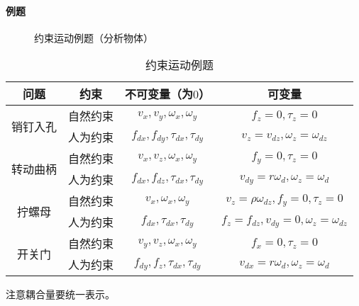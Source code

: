 \documentclass[
12pt, %
a4paper, 
oneside, %
headinclude,footinclude, %
]{scrartcl}
\begin{document}
\paragraph{例题}
\begin{figure}[H]
\centering
\subfloat[销钉入孔（钉子）]{\texttt{[image: 8.1]}} \quad
\subfloat[转动曲柄（扳手）]{\texttt{[image: 8.2]}} \quad
\subfloat[拧螺母（螺刀）]{\texttt{[image: 8.3]}} \quad
{} 
\caption[约束运动例题]{约束运动例题（分析物体）}
\end{figure}
{\footnotesize
\begin{table}[H]
\centering
\begin{tabular}{c|c|c|c}
\hline
问题 & 约束 & 不可变量（为$ 0 $） & 可变量 \\
\hline
\multirow{2}{*}{销钉入孔} & 自然约束 & $ v_x, v_y, \omega_x, \omega_y $ & $ f_z = 0, \tau_z = 0 $ \\
\cline{2-4}
& 人为约束 & $ f_{dx}, f_{dy}, \tau_{dx},  \tau_{dy} $ & $ v_z = v_{dz}, \omega_z = \omega_{dz} $ \\
\hline
\multirow{2}{*}{转动曲柄} & 自然约束 & $ v_x, v_z, \omega_x, \omega_y $ & $ f_y = 0, \tau_z = 0 $ \\
\cline{2-4}
& 人为约束 & $ f_{dx}, f_{dz}, \tau_{dx}, \tau_{dy} $ & $ v_{dy} = r\omega_d, \omega_z = \omega_d $ \\
\hline
\multirow{2}{*}{拧螺母} & 自然约束 & $ v_x, \omega_x, \omega_y $ & $ v_z = \rho \omega_{dz}, f_y = 0, \tau_z = 0 $ \\
\cline{2-4}
& 人为约束 & $ f_{dx}, \tau_{dx}, \tau_{dy} $ & $ f_z = f_{dz}, v_{dy} = 0, \omega_z = \omega_{dz} $ \\
\hline
\multirow{2}{*}{开关门} & 自然约束 & $ v_y, v_z, \omega_x, \omega_y $ & $ f_x = 0, \tau_z = 0 $ \\
\cline{2-4}
& 人为约束 & $ f_{dy}, f_z, \tau_{dx}, \tau_{dy} $ & $ v_{dx} = r \omega_d, \omega_z = \omega_d $ \\
\hline
\end{tabular}
\caption{约束运动例题}
\end{table}

注意耦合量要统一表示。
}
\end{document}
